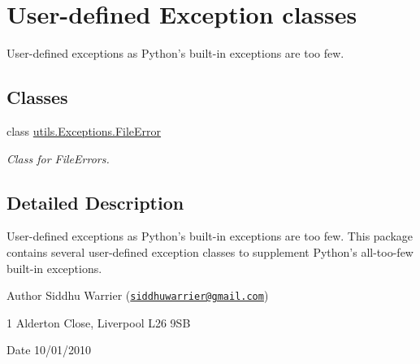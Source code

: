 \hypertarget{group__Exceptions}{
\section{User-\/defined Exception classes}
\label{group__Exceptions}
}


User-\/defined exceptions as Python's built-\/in exceptions are too few.  
\subsection*{Classes}
\begin{DoxyCompactItemize}
\item 
class \hyperlink{classutils_1_1Exceptions_1_1FileError}{utils.Exceptions.FileError}
\begin{DoxyCompactList}\small\item\em Class for FileErrors. \item\end{DoxyCompactList}\end{DoxyCompactItemize}


\subsection{Detailed Description}
User-\/defined exceptions as Python's built-\/in exceptions are too few. This package contains several user-\/defined exception classes to supplement Python's all-\/too-\/few built-\/in exceptions. \begin{DoxyAuthor}{Author}
Siddhu Warrier (\href{mailto:siddhuwarrier@gmail.com}{\tt siddhuwarrier@gmail.com}) 

1 Alderton Close, Liverpool L26 9SB 
\end{DoxyAuthor}
\begin{DoxyDate}{Date}
10/01/2010 
\end{DoxyDate}
